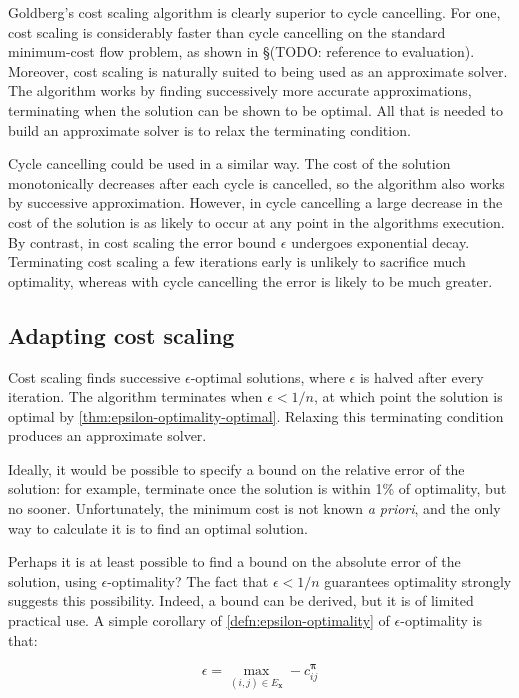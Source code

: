 Goldberg's cost scaling algorithm is clearly superior to cycle cancelling. For one, cost scaling is considerably faster than cycle cancelling on the standard minimum-cost flow problem, as shown in \S(TODO: reference to evaluation). Moreover, cost scaling is naturally suited to being used as an approximate solver. The algorithm works by finding successively more accurate approximations, terminating when the solution can be shown to be optimal. All that is needed to build an approximate solver is to relax the terminating condition.

Cycle cancelling could be used in a similar way. The cost of the solution monotonically decreases after each cycle is cancelled, so the algorithm also works by successive approximation. However, in cycle cancelling a large decrease in the cost of the solution is as likely to occur at any point in the algorithms execution. By contrast, in cost scaling the error bound $\epsilon$ undergoes exponential decay. Terminating cost scaling a few iterations early is unlikely to sacrifice much optimality, whereas with cycle cancelling the error is likely to be much greater.

\subsection{Adapting cost scaling}

Cost scaling finds successive $\epsilon$-optimal solutions, where $\epsilon$ is halved after every iteration. The algorithm terminates when $\epsilon < 1/n$, at which point the solution is optimal by \cref{thm:epsilon-optimality-optimal}. Relaxing this terminating condition produces an approximate solver.

Ideally, it would be possible to specify a bound on the relative error of the solution: for example, terminate once the solution is within 1\% of optimality, but no sooner. Unfortunately, the minimum cost is not known \emph{a priori}, and the only way to calculate it is to find an optimal solution. 

Perhaps it is at least possible to find a bound on the absolute error of the solution, using $\epsilon$-optimality? The fact that $\epsilon < 1/n$ guarantees optimality strongly suggests this possibility. Indeed, a bound can be derived, but it is of limited practical use. A simple corollary of \cref{defn:epsilon-optimality} of $\epsilon$-optimality is that:

\[\epsilon = \max_{(i,j) \in E_\mathbf{x}} -c_{ij}^{\boldsymbol{\pi}}\]

